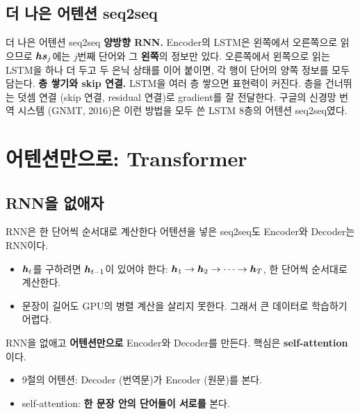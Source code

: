 \documentclass[aspectratio=169,11pt]{beamer}
\begin{document}
\subsection{더 나은 어텐션 seq2seq}

\begin{frame}{더 나은 어텐션 seq2seq}
\textbf{양방향 RNN.} Encoder의 LSTM은 왼쪽에서 오른쪽으로 읽으므로
$\bm{hs}_j$에는 $j$번째 단어와 그 \textbf{왼쪽}의 정보만 있다.
오른쪽에서 왼쪽으로 읽는 LSTM을 하나 더 두고 두 은닉 상태를 이어 붙이면,
각 행이 단어의 양쪽 정보를 모두 담는다.
\vskip1mm
\textbf{층 쌓기와 skip 연결.} LSTM을 여러 층 쌓으면 표현력이 커진다.
층을 건너뛰는 덧셈 연결 (skip 연결, residual 연결)로 gradient를 잘 전달한다.
구글의 신경망 번역 시스템 (GNMT, 2016)은 이런 방법을 모두 쓴 LSTM 8층의 어텐션 seq2seq였다.
\end{frame}

\section{어텐션만으로: Transformer}

\subsection{RNN을 없애자}

\begin{frame}{RNN은 한 단어씩 순서대로 계산한다}
어텐션을 넣은 seq2seq도 Encoder와 Decoder는 RNN이다.
\begin{itemize}
\item $\bm{h}_t$를 구하려면 $\bm{h}_{t-1}$이 있어야 한다:
  $\bm{h}_1\to\bm{h}_2\to\cdots\to\bm{h}_T$, 한 단어씩 순서대로 계산한다.
\item 문장이 길어도 GPU의 병렬 계산을 살리지 못한다.
  그래서 큰 데이터로 학습하기 어렵다.
\end{itemize}
\vskip2mm
\begin{keybox}
RNN을 없애고 \textbf{어텐션만으로} Encoder와 Decoder를 만든다.
핵심은 \textbf{self-attention}이다.
\begin{itemize}
\item 9절의 어텐션: Decoder (번역문)가 Encoder (원문)를 본다.
\item self-attention: \textbf{한 문장 안의 단어들이 서로를} 본다.
\end{itemize}
\end{keybox}
\end{frame}
\end{document}
